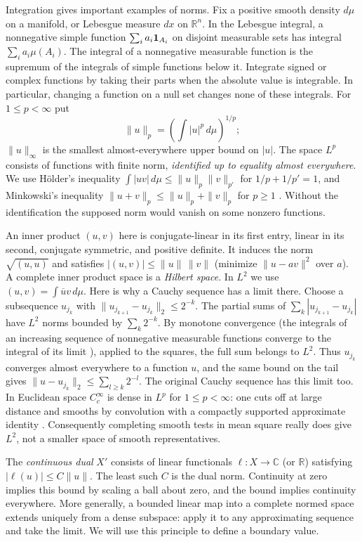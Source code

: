 Integration gives important examples of norms. Fix a positive smooth density $d\mu$ on a manifold, or Lebesgue measure $dx$ on $\mathbb R^n$. In the Lebesgue integral, a nonnegative simple function $\sum_i a_i{\bf1}_{A_i}$ on disjoint measurable sets has integral $\sum_i a_i\mu(A_i)$. The integral of a nonnegative measurable function is the supremum of the integrals of simple functions below it. Integrate signed or complex functions by taking their parts when the absolute value is integrable. In particular, changing a function on a null set changes none of these integrals. For $1\leq p<\infty$ put
\[
  \|u\|_p=\left(\int |u|^p\,d\mu\right)^{1/p};
\]
$\|u\|_\infty$ is the smallest almost-everywhere upper bound on $|u|$. The space $L^p$ consists of functions with finite norm, \emph{identified up to equality almost everywhere}. We use H\"older's inequality $\int |uv|\,d\mu\leq\|u\|_p\|v\|_{p'}$ for $1/p+1/p'=1$, and Minkowski's inequality $\|u+v\|_p\leq\|u\|_p+\|v\|_p$ for $p\geq1$ \cite[Appendix~B, integral inequalities]{Evans}. Without the identification the supposed norm would vanish on some nonzero functions.

An inner product $(u,v)$ here is conjugate-linear in its first entry, linear in its second, conjugate symmetric, and positive definite. It induces the norm $\sqrt{(u,u)}$ and satisfies $|(u,v)|\leq\|u\|\,\|v\|$ (minimize $\|u-av\|^2$ over $a$). A complete inner product space is a \emph{Hilbert space}. In $L^2$ we use $(u,v)=\int\overline u v\,d\mu$. Here is why a Cauchy sequence has a limit there. Choose a subsequence $u_{j_k}$ with $\|u_{j_{k+1}}-u_{j_k}\|_2\leq 2^{-k}$. The partial sums of $\sum_k |u_{j_{k+1}}-u_{j_k}|$ have $L^2$ norms bounded by $\sum_k 2^{-k}$. By monotone convergence (the integrals of an increasing sequence of nonnegative measurable functions converge to the integral of its limit \cite[Ch.~I, Thm.~I.10]{RS}), applied to the squares, the full sum belongs to $L^2$. Thus $u_{j_k}$ converges almost everywhere to a function $u$, and the same bound on the tail gives $\|u-u_{j_k}\|_2\leq\sum_{l\geq k}2^{-l}$. The original Cauchy sequence has this limit too. In Euclidean space $C_c^\infty$ is dense in $L^p$ for $1\leq p<\infty$: one cuts off at large distance and smooths by convolution with a compactly supported approximate identity \cite[Appendix~C, mollifiers]{Evans}. Consequently completing smooth tests in mean square really does give $L^2$, not a smaller space of smooth representatives.

The \emph{continuous dual} $X'$ consists of linear functionals $\ell:X\to\mathbb C$ (or $\mathbb R$) satisfying $|\ell(u)|\leq C\|u\|$. The least such $C$ is the dual norm. Continuity at zero implies this bound by scaling a ball about zero, and the bound implies continuity everywhere. More generally, a bounded linear map into a complete normed space extends uniquely from a dense subspace: apply it to any approximating sequence and take the limit. We will use this principle to define a boundary value.

